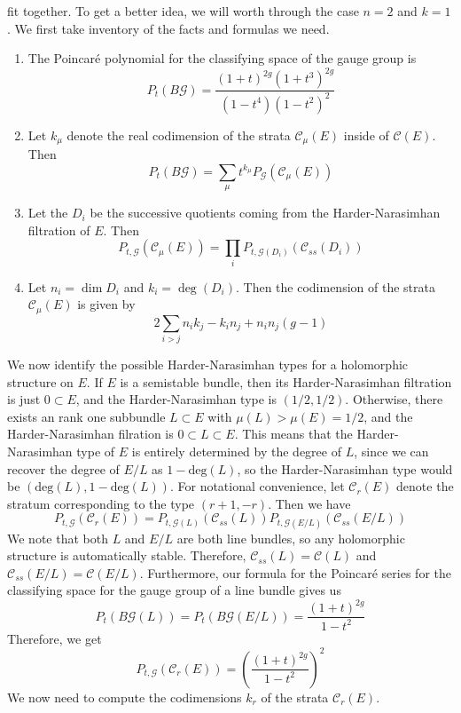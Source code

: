 fit together. To get a better idea, we will worth through the case
$n = 2$ and $k = 1$. We first take inventory of the facts and formulas we need.
\begin{enumerate}
  \item The Poincar\'e polynomial for the classifying space of the gauge group is
  \[
  P_t(B\mathscr{G}) = \frac{(1+t)^{2g}(1+t^3)^{2g}}{(1-t^4)(1-t^2)^2}
  \]
  \item  Let $k_\mu$ denote the real codimension of the strata $\mathscr{C}_\mu(E)$
  inside of $\mathscr{C}(E)$. Then
  \[
  P_t(B\mathscr{G}) = \sum_{\mu}t^{k_\mu}P_{\mathscr{G}}(\mathscr{C}_\mu(E))
  \]
  \item Let the $D_i$ be the successive quotients coming from the Harder-Narasimhan
  filtration of $E$. Then
  \[
  P_{t,\mathscr{G}}(\mathscr{C}_\mu(E))
  = \prod_iP_{t,\mathscr{G}(D_i)}(\mathscr{C}_{ss}(D_i))
  \]
  \item Let $n_i = \dim D_i$ and $k_i = \deg(D_i)$. Then the codimension
  of the strata $\mathscr{C}_\mu(E)$ is given by
  \[
  2\sum_{i > j}n_ik_j-k_in_j + n_in_j(g-1)
  \]
\end{enumerate}
%
We now identify the possible Harder-Narasimhan types for a holomorphic structure
on $E$. If $E$ is a semistable bundle, then its Harder-Narasimhan filtration
is just $0 \subset E$, and the Harder-Narasimhan type is $(1/2,1/2)$. Otherwise,
there exists an rank one subbundle $L \subset E$ with $\mu(L) > \mu(E) = 1/2$, and
the Harder-Narasimhan filration is $0 \subset L \subset E$. This means that the
Harder-Narasimhan type of $E$ is entirely determined by the degree of $L$, since
we can recover the degree of $E/L$ as $1 - \mathrm{deg}(L)$, so the
Harder-Narasimhan type would be $(\mathrm{deg}(L), 1- \mathrm{deg}(L))$. For
notational convenience, let $\mathscr{C}_r(E)$ denote the stratum corresponding
to the type $(r+1,-r)$. Then we have
\[
P_{t,\mathscr{G}}(\mathscr{C}_r(E))
= P_{t,\mathscr{G}(L)}(\mathscr{C}_{ss}(L)) P_{t,\mathscr{G}(E/L)}(\mathscr{C}_{ss}(E/L))
\]
We note that both $L$ and $E/L$ are both line bundles, so any holomorphic structure
is automatically stable. Therefore, $\mathscr{C}_{ss}(L) = \mathscr{C}(L)$ and
$\mathscr{C}_{ss}(E/L) = \mathscr{C}(E/L)$. Furthermore, our formula for the
Poincar\'e series for the classifying space for the gauge group of a line bundle
gives us
\[
P_t(B\mathscr{G}(L)) = P_t(B\mathscr{G}(E/L)) = \frac{(1+t)^{2g}}{1-t^2}
\]
Therefore, we get
\[
P_{t, \mathscr{G}}(\mathscr{C}_r(E)) = \left(\frac{(1+t)^{2g}}{1-t^2}\right)^2
\]
We now need to compute the codimensions $k_r$ of the strata $\mathscr{C}_r(E)$.
